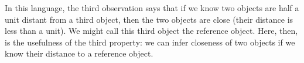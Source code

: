 In this language, the third
observation says that if we
know two objects are half a unit distant
from a third object, then
the two objects are close (their
distance is less than a unit).
We might call this third object
the reference object.
Here, then, is the usefulness of
the third property:
we can infer closeness of two objects
if we know their distance to a reference
object.



\strats
